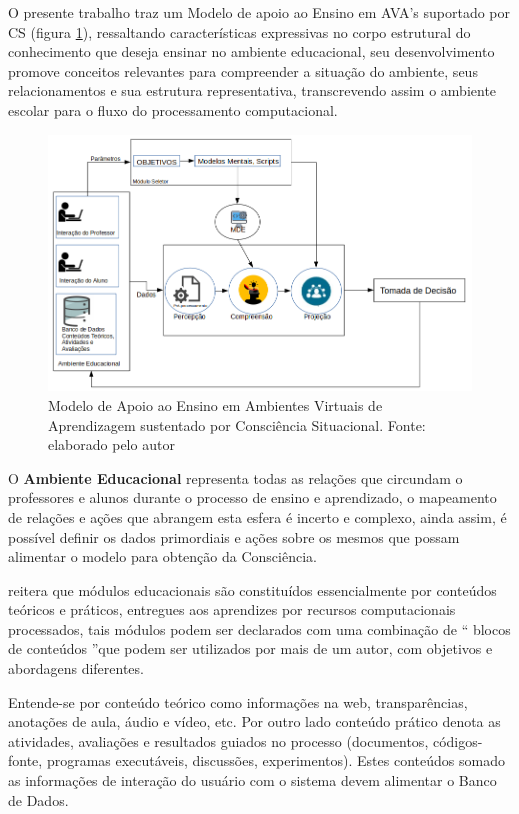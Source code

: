 \documentclass[12pt]{article}
\begin{document}
O presente trabalho traz um Modelo de apoio ao Ensino em AVA's suportado por CS (figura \ref{modeloConceitual}), ressaltando características expressivas no corpo estrutural do conhecimento que deseja ensinar no ambiente educacional, seu desenvolvimento promove conceitos relevantes para compreender a situação do ambiente, seus relacionamentos e sua estrutura representativa, transcrevendo assim o ambiente escolar para o fluxo do processamento computacional.

\begin{figure}[H]
	\centering
	\includegraphics[scale=0.55]{figuras/teste_modelov02}
	\caption{Modelo de Apoio ao Ensino em Ambientes Virtuais de Aprendizagem sustentado por
		Consciência Situacional. Fonte: elaborado pelo autor }
	\label{modeloConceitual}	
\end{figure}



O \textbf{Ambiente Educacional} representa todas as relações que circundam o professores e alunos durante o processo de ensino e aprendizado, o mapeamento de relações e ações que abrangem esta esfera é incerto e complexo, ainda assim, é possível definir os dados primordiais e ações sobre os mesmos que possam alimentar o modelo para obtenção da Consciência.

\cite{Barbosa_2004} reitera que módulos educacionais são constituídos essencialmente por conteúdos teóricos e práticos, entregues aos aprendizes por recursos computacionais processados, tais módulos podem ser declarados com uma combinação de “ blocos de conteúdos ”que podem ser utilizados por mais de um autor, com objetivos e abordagens diferentes. 

Entende-se por conteúdo teórico como informações na web, transparências, anotações de aula, áudio e vídeo, etc. Por outro lado conteúdo prático denota as atividades, avaliações e resultados guiados no processo (documentos, códigos-fonte, programas executáveis, discussões, experimentos). Estes conteúdos somado as informações de interação do usuário com o sistema devem alimentar o Banco de Dados.
 
\end{document}
